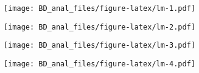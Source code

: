 \documentclass[]{article}
\newenvironment{Shaded}{\begin{snugshade}}{\end{snugshade}}
\newcommand{\KeywordTok}[1]{\textcolor[rgb]{0.13,0.29,0.53}{\textbf{#1}}}
\newcommand{\DataTypeTok}[1]{\textcolor[rgb]{0.13,0.29,0.53}{#1}}
\newcommand{\StringTok}[1]{\textcolor[rgb]{0.31,0.60,0.02}{#1}}
\newcommand{\OperatorTok}[1]{\textcolor[rgb]{0.81,0.36,0.00}{\textbf{#1}}}
\newcommand{\NormalTok}[1]{#1}
\begin{document}
\texttt{[image: BD\_anal\_files/figure-latex/lm-1.pdf]}

\begin{Shaded}
\end{Shaded}

\texttt{[image: BD\_anal\_files/figure-latex/lm-2.pdf]}

\begin{Shaded}
\end{Shaded}

\texttt{[image: BD\_anal\_files/figure-latex/lm-3.pdf]}

\begin{Shaded}
\end{Shaded}

\texttt{[image: BD\_anal\_files/figure-latex/lm-4.pdf]}

\begin{Shaded}
\end{Shaded}
\end{document}
